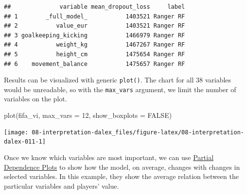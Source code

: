\documentclass[
]{scrbook}
\newenvironment{Shaded}{\begin{snugshade}}{\end{snugshade}}
\newcommand{\AttributeTok}[1]{\textcolor[rgb]{0.77,0.63,0.00}{#1}}
\newcommand{\ConstantTok}[1]{\textcolor[rgb]{0.00,0.00,0.00}{#1}}
\newcommand{\DecValTok}[1]{\textcolor[rgb]{0.00,0.00,0.81}{#1}}
\newcommand{\FunctionTok}[1]{\textcolor[rgb]{0.00,0.00,0.00}{#1}}
\newcommand{\NormalTok}[1]{#1}
\newcommand{\OtherTok}[1]{\textcolor[rgb]{0.56,0.35,0.01}{#1}}
\newcommand{\SpecialCharTok}[1]{\textcolor[rgb]{0.00,0.00,0.00}{#1}}
\newcommand{\StringTok}[1]{\textcolor[rgb]{0.31,0.60,0.02}{#1}}
\renewenvironment{Shaded} {\begin{snugshade}\small} {\end{snugshade}}
\begin{document}
\begin{verbatim}
##              variable mean_dropout_loss     label
## 1        _full_model_           1403521 Ranger RF
## 2           value_eur           1403521 Ranger RF
## 3 goalkeeping_kicking           1466979 Ranger RF
## 4           weight_kg           1467267 Ranger RF
## 5           height_cm           1475654 Ranger RF
## 6    movement_balance           1475657 Ranger RF
\end{verbatim}

Results can be visualized with generic \texttt{plot()}. The chart for all 38 variables would be unreadable, so with the \texttt{max\_vars} argument, we limit the number of variables on the plot.

\begin{Shaded}
\begin{Highlighting}[]
\FunctionTok{plot}\NormalTok{(fifa\_vi, }\AttributeTok{max\_vars =} \DecValTok{12}\NormalTok{, }\AttributeTok{show\_boxplots =} \ConstantTok{FALSE}\NormalTok{)}
\end{Highlighting}
\end{Shaded}

\begin{center}\texttt{[image: 08-interpretation-dalex\_files/figure-latex/08-interpretation-dalex-011-1]} \end{center}

Once we know which variables are most important, we can use \href{https://pbiecek.github.io/ema/partialDependenceProfiles.html}{Partial Dependence Plots} to show how the model, on average, changes with changes in selected variables. In this example, they show the average relation between the particular variables and players' value.

\begin{Shaded}
\end{Shaded}
\end{document}
